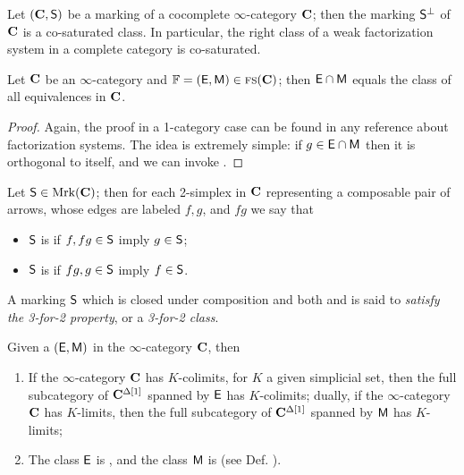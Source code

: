 \begin{proposition}
Let $(\mathbf{C},\mathsf{S})$ be a marking of a cocomplete $\infty$\hyp{}category $\mathbf{C}$; then the marking $\mathsf{S}^\perp$ of $\mathbf{C}$ is a co\hyp{}saturated class. In particular, the right class of a weak factorization system in a complete category is co\hyp{}saturated.
\end{proposition}
\begin{proposition}\label{thereiso}
Let $\mathbf{C}$ be an $\infty$\hyp{}category and $\mathbb{F} =(\mathsf{E},\mathsf{M})\in \text{\scshape fs}(\mathbf{C})$; then $\mathsf{E}\cap \mathsf{M}$ equals the class of all equivalences in $\mathbf{C}$.
\end{proposition}
\begin{proof}
Again, the proof in a 1\hyp{}category case can be found in any reference about factorization systems. The idea is extremely simple: if $g\in\mathsf{E}\cap \mathsf{M}$ then it is orthogonal to itself, and we can invoke .
\end{proof}
\begin{definition}\label{def:3for2}
Let $\mathsf{S}\in\text{Mrk}(\mathbf{C})$; then for each 2\hyp{}simplex in $\mathbf{C}$ representing a composable pair of arrows, whose edges are labeled $f,g$, and  $f g$  we say that
\begin{itemize}
\item $\mathsf{S}$ is  if $f, fg\in \mathsf{S}$ imply $g\in\mathsf{S}$;
\item $\mathsf{S}$ is  if $fg, g\in \mathsf{S}$ imply $f\in\mathsf{S}$.
\end{itemize}
A marking $\mathsf{S}$ which is closed under composition and both  and  is said to \emph{satisfy the 3\hyp{}for\hyp{}2 property}, or a \emph{3\hyp{}for\hyp{}2 class}.
\end{definition}
\begin{proposition}
\label{prop:clos}
Given a  $(\mathsf{E},\mathsf{M})$ in the $\infty$\hyp{}category $\mathbf{C}$, then
\begin{enumerate}
\item {}If the $\infty$\hyp{}category $\mathbf{C}$ has $K$\hyp{}colimits, for $K$ a given simplicial set, then the full subcategory of $\mathbf{C}^{\Delta[1]}$ spanned by $\mathsf{E}$ has $K$\hyp{}colimits; dually, if  the $\infty$\hyp{}category $\mathbf{C}$ has $K$\hyp{}limits, then the full subcategory of $\mathbf{C}^{\Delta[1]}$ spanned by $\mathsf{M}$ has $K$\hyp{}limits;
\item The class $\mathsf{E}$ is , and the class $\mathsf{M}$ is  (see Def. ).
\end{enumerate}
\end{proposition}
